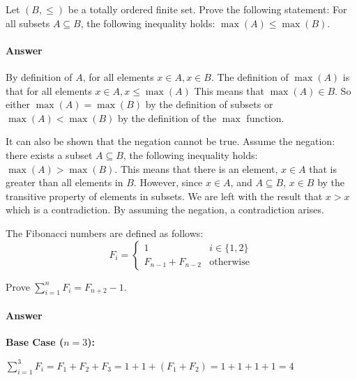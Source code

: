 \documentclass{article}
\begin{document}
 

Let $(B,\leq)$ be a totally ordered finite set. Prove the following
statement: For all subsets $A \subseteq B$, the following inequality
holds: $\max(A) \leq \max(B)$.

\paragraph{Answer}

By definition of $A$, for all elements $x \in A, x\in B$. The definition of $\max(A)$ is that for all elements $x \in A, x \leq \max(A)$
This means that $\max(A) \in B$. So either $\max(A) = \max(B)$ by the definition of subsets or $ \max(A) < \max(B)$ by the definition of the $\max$ function.

It can also be shown that the negation cannot be true. Assume the negation: there exists a subset  $A \subseteq B$, the following inequality
holds: $\max(A) > \max(B)$. This means that there is an element, $x \in A$ that is greater than all elements in $B$. However, since $x \in A$,
 and $A \subseteq B$, $x \in B$ by the transitive property of elements in subsets. We are left with the result that $x>x$ which is a contradiction. 
 By assuming the negation, a contradiction arises.

 

The Fibonacci numbers are defined as follows:
$$
    F_i = \begin{cases}
            1 & i \in \{1,2\} \\
            F_{n-1}+F_{n-2} & \text{otherwise}
          \end{cases}
$$

Prove $\sum_{i=1}^n F_i = F_{n+2}-1$.

\paragraph{Answer}
\textbf{Base Case ($n=3$):}

$\sum_{i=1}^3F_i = F_1 + F_2 +F_3 = 1 + 1 + (F_1 + F_2) = 1+1+1+1 = 4$
\end{document}
